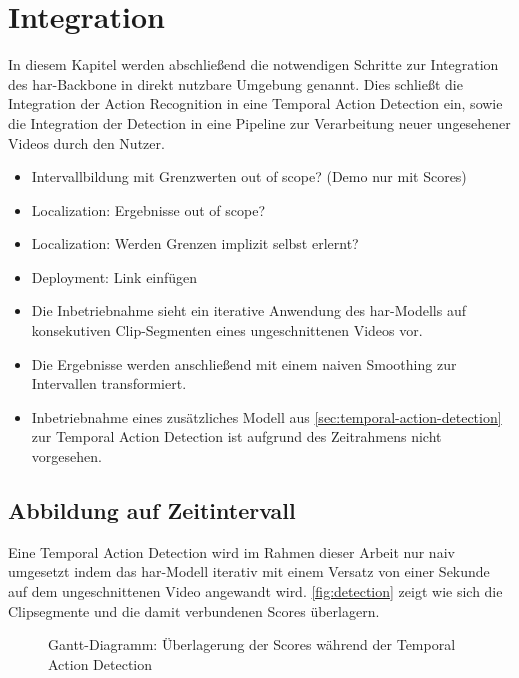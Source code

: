 \chapter{Integration}
\label{ch:integration}

In diesem Kapitel werden abschließend die notwendigen Schritte zur Integration des \gls{har}-Backbone in direkt nutzbare Umgebung genannt.
Dies schließt die Integration der Action Recognition in eine Temporal Action Detection ein, sowie die Integration der Detection in eine Pipeline zur Verarbeitung neuer ungesehener Videos durch den Nutzer.

\begin{tcolorbox}[title=Todo]
    \begin{itemize}
        \item Intervallbildung mit Grenzwerten out of scope? (Demo nur mit Scores)
        \item Localization: Ergebnisse out of scope?
        \item Localization: Werden Grenzen implizit selbst erlernt?
        \item Deployment: Link einfügen
        \item Die Inbetriebnahme sieht ein iterative Anwendung des \gls{har}-Modells auf konsekutiven Clip-Segmenten eines ungeschnittenen Videos vor.
        \item Die Ergebnisse werden anschließend mit einem naiven Smoothing zur Intervallen transformiert.
        \item Inbetriebnahme eines zusätzliches Modell aus \autoref{sec:temporal-action-detection} zur Temporal Action Detection ist aufgrund des Zeitrahmens nicht vorgesehen.
    \end{itemize}
\end{tcolorbox}

\section{Abbildung auf Zeitintervall}
\label{sec:localization}

Eine Temporal Action Detection wird im Rahmen dieser Arbeit nur naiv umgesetzt indem das \gls{har}-Modell iterativ mit einem Versatz von einer Sekunde auf dem ungeschnittenen Video angewandt wird.
\autoref{fig:detection} zeigt wie sich die Clipsegmente und die damit verbundenen Scores überlagern.

\begin{figure}
    \centering
    \caption{Gantt-Diagramm: Überlagerung der Scores während der Temporal Action Detection}
    \label{fig:detection}
\end{figure}

